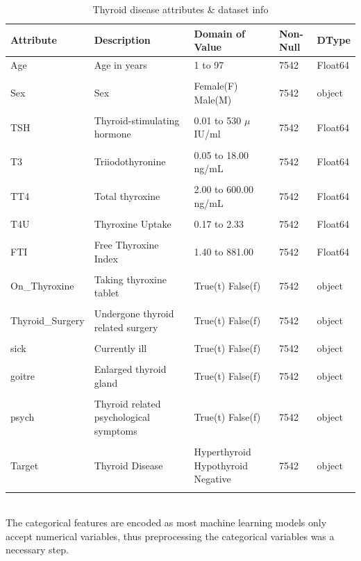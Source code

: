 \begin{table}[h]
\caption{Thyroid disease attributes \& dataset info}
\begin{tabular}{p{2.5cm}  p{4cm}  p{3.2cm}  p{1.5cm} p{1.5cm}}
\hline
Attribute & Description & Domain of Value & Non-Null & DType \\
\hline
Age & Age in years & 1 to 97 & 7542&Float64\\\\
Sex & Sex & Female(F) Male(M) & 7542 & object\\\\
TSH & Thyroid-stimulating hormone & 0.01 to 530 \(\mu\)IU/ml & 7542&Float64\\\\
T3 & Triiodothyronine & 0.05 to 18.00 ng/mL& 7542&Float64\\\\
TT4 & Total thyroxine & 2.00 to 600.00 ng/mL& 7542&Float64\\\\
T4U & Thyroxine Uptake & 0.17 to 2.33 & 7542 & Float64\\\\
FTI & Free Thyroxine Index & 1.40 to 881.00 & 7542 & Float64\\\\
On\_Thyroxine&  Taking thyroxine tablet & True(t) False(f) & 7542&object\\\\
Thyroid\_Surgery& Undergone thyroid related surgery&True(t) False(f) & 7542&object\\\\
sick & Currently ill&True(t) False(f)&7542&object\\\\
goitre & Enlarged thyroid gland& True(t) False(f)  & 7542&object\\\\
psych & Thyroid related psychological symptoms&True(t) False(f)&7542&object\\\\
Target & Thyroid Disease & Hyperthyroid Hypothyroid Negative & 7542 & object\\\\
\hline
\end{tabular}
\end{table}\\
The categorical features are encoded as most machine learning models only accept numerical variables, thus preprocessing the categorical variables was a necessary step.
\newpage
\newpage
